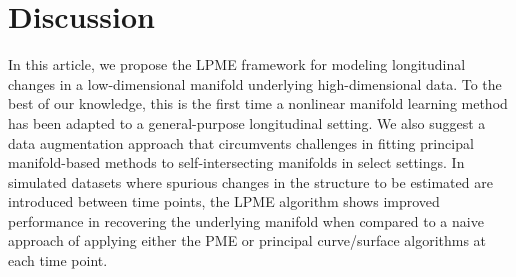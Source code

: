 \documentclass[12pt]{article}
\theoremstyle{definition}
\begin{document}
\section{Discussion}\label{s:discussion}

In this article, we propose the LPME framework for modeling longitudinal changes in a low-dimensional manifold underlying high-dimensional data. To the best of our knowledge, this is the first time a nonlinear manifold learning method has been adapted to a general-purpose longitudinal setting. We also suggest a data augmentation approach that circumvents challenges in fitting principal manifold-based methods to self-intersecting manifolds in select settings. In simulated datasets where spurious changes in the structure to be estimated are introduced between time points, the LPME algorithm shows improved performance in recovering the underlying manifold when compared to a naive approach of applying either the PME or principal curve/surface algorithms at each time point. 

\end{document}
